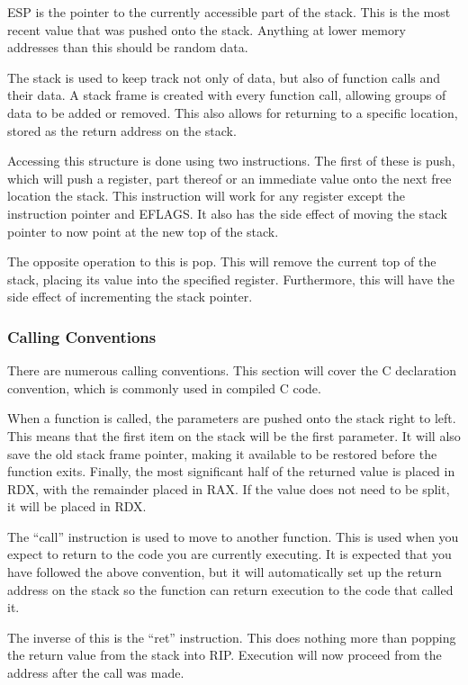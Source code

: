 				ESP is the pointer to the currently accessible part of the stack.
				This is the most recent value that was pushed onto the stack.
				Anything at lower memory addresses than this should be random data.

				The stack is used to keep track not only of data, but also of function calls and their data.
				A stack frame is created with every function call, allowing groups of data to be added or removed.
				This also allows for returning to a specific location, stored as the return address on the stack.

				Accessing this structure is done using two instructions.
				The first of these is push, which will push a register, part thereof or an immediate value onto the next free location the stack.
				This instruction will work for any register except the instruction pointer and EFLAGS.
				It also has the side effect of moving the stack pointer to now point at the new top of the stack.

				The opposite operation to this is pop.
				This will remove the current top of the stack, placing its value into the specified register.
				Furthermore, this will have the side effect of incrementing the stack pointer.

			\subsubsection{Calling Conventions}
				There are numerous calling conventions.
				This section will cover the C declaration convention, which is commonly used in compiled C code.

				When a function is called, the parameters are pushed onto the stack right to left.
				This means that the first item on the stack will be the first parameter.
				It will also save the old stack frame pointer, making it available to be restored before the function exits.
				Finally, the most significant half of the returned value is placed in RDX, with the remainder placed in RAX.
				If the value does not need to be split, it will be placed in RDX.

				The ``call'' instruction is used to move to another function.
				This is used when you expect to return to the code you are currently executing.
				It is expected that you have followed the above convention, but it will automatically set up the return address on the stack so the function can return execution to the code that called it.

				The inverse of this is the ``ret'' instruction.
				This does nothing more than popping the return value from the stack into RIP.
				Execution will now proceed from the address after the call was made.

